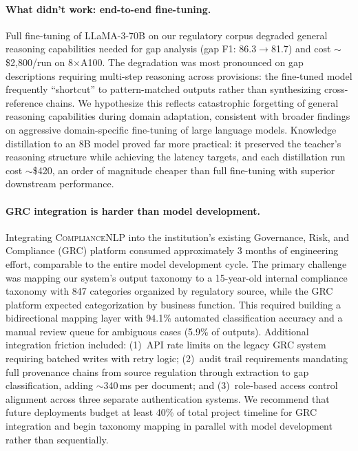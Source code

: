 \documentclass[11pt]{article}
\begin{document}
\paragraph{What didn't work: end-to-end fine-tuning.} Full fine-tuning of LLaMA-3-70B on our regulatory corpus degraded general reasoning capabilities needed for gap analysis (gap F1: 86.3$\to$81.7) and cost $\sim$\$2{,}800/run on 8$\times$A100. The degradation was most pronounced on gap descriptions requiring multi-step reasoning across provisions: the fine-tuned model frequently ``shortcut'' to pattern-matched outputs rather than synthesizing cross-reference chains. We hypothesize this reflects catastrophic forgetting of general reasoning capabilities during domain adaptation, consistent with broader findings on aggressive domain-specific fine-tuning of large language models. Knowledge distillation to an 8B model proved far more practical: it preserved the teacher's reasoning structure while achieving the latency targets, and each distillation run cost $\sim$\$420, an order of magnitude cheaper than full fine-tuning with superior downstream performance.

\paragraph{GRC integration is harder than model development.} Integrating \textsc{ComplianceNLP} into the institution's existing Governance, Risk, and Compliance (GRC) platform consumed approximately 3 months of engineering effort, comparable to the entire model development cycle. The primary challenge was mapping our system's output taxonomy to a 15-year-old internal compliance taxonomy with 847 categories organized by regulatory source, while the GRC platform expected categorization by business function. This required building a bidirectional mapping layer with 94.1\% automated classification accuracy and a manual review queue for ambiguous cases (5.9\% of outputs). Additional integration friction included: (1)~API rate limits on the legacy GRC system requiring batched writes with retry logic; (2)~audit trail requirements mandating full provenance chains from source regulation through extraction to gap classification, adding $\sim$340\,ms per document; and (3)~role-based access control alignment across three separate authentication systems. We recommend that future deployments budget at least 40\% of total project timeline for GRC integration and begin taxonomy mapping in parallel with model development rather than sequentially.
\end{document}
